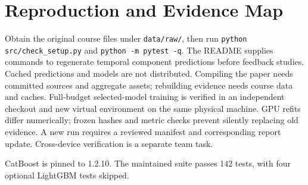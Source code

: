 \documentclass[conference]{IEEEtran}
\newcommand{\code}[1]{\texttt{\small #1}}
\begin{document}
\clearpage
\nobalance
{}


\clearpage
\appendices
\section{Reproduction and Evidence Map}\label{app:reproduce}
Obtain the original course files under \code{data/raw/}, then run \code{python src/check\_setup.py} and \code{python -m pytest -q}. The README supplies commands to regenerate temporal component predictions before feedback studies. Cached predictions and models are not distributed. Compiling the paper needs committed sources and aggregate assets; rebuilding evidence needs course data and caches. Full-budget selected-model training is verified in an independent checkout and new virtual environment on the same physical machine. GPU refits differ numerically; frozen hashes and metric checks prevent silently replacing old evidence. A new run requires a reviewed manifest and corresponding report update. Cross-device verification is a separate team task.

CatBoost is pinned to 1.2.10. The maintained suite passes 142 tests, with four optional LightGBM tests skipped.
\end{document}
